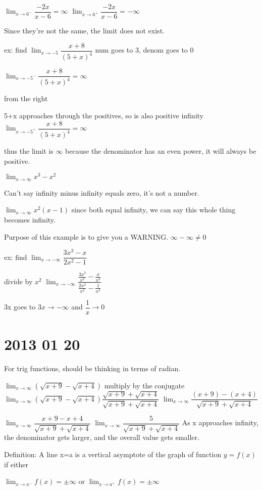 \documentclass[12pt]{article}
\begin{document}
$\lim_{x\to 6^-}\dfrac{-2x}{x-6} = \infty$
$\lim_{x\to 6^+}\dfrac{-2x}{x-6} = -\infty$

Since they're not the same, the limit does not exist.


ex: find $\lim_{x \to -5}\dfrac{x+8}{(5+x)^4}$ num goes to 3, denom goes to 0

$\lim_{x \to -5^-}\dfrac{x+8}{(5+x)^4} = \infty$

from the right

5+x approaches through the positives, so is also positive infinity
$\lim_{x \to -5^+}\dfrac{x+8}{(5+x)^4} = \infty$

thus the limit is $\infty$
because the denominator has an even power, it will always be positive.

$\lim_{x\to\infty}x^3-x^2$

Can't say infinity minus infinity equals zero, it's not a number.

$\lim_{x\to\infty}x^2(x-1)$ since both equal infinity, we can say this whole thing becomes infinity. 

Purpose of this example is to give you a WARNING. $\infty - \infty \neq 0$

ex: find $\lim_{x\to - \infty}\dfrac{3x^3-x}{2x^2-1}$

divide by $x^2$
$\lim_{x\to - \infty}\dfrac{\frac{3x^3}{x^2}-\frac{x}{x^2}}{\frac{2x^2}{x^2}-\frac{1}{x^2}}$

3x goes to $3x \to -\infty$ and $\dfrac{1}{x} \to 0$

\section{2013 01 20 }
For trig functions, should be thinking in terms of radian.

$\lim_{x\to\infty}(\sqrt{x+9} - \sqrt{x+4})$
multiply by the conjugate
$\lim_{x\to\infty}(\sqrt{x+9} - \sqrt{x+4})\dfrac{\sqrt{x+9} + \sqrt{x+4}}{\sqrt{x+9} + \sqrt{x+4}}$
$\lim_{x\to\infty}\dfrac{(x+9) - (x+4)}{\sqrt{x+9} + \sqrt{x+4}}$

$\lim_{x\to\infty}\dfrac{x+9 - x+4}{\sqrt{x+9} + \sqrt{x+4}}$
$\lim_{x\to\infty}\dfrac{5}{\sqrt{x+9} + \sqrt{x+4}}$
As x approaches infinity, the denominator gets larger, and the overall value gets smaller.

Definition: A line x=a is a vertical asymptote of the graph of function $y=f(x)$ if either 

$\lim_{x\to a^-}f(x) = \pm\infty$ or $\lim_{x\to a^+}f(x) = \pm\infty$
\end{document}

